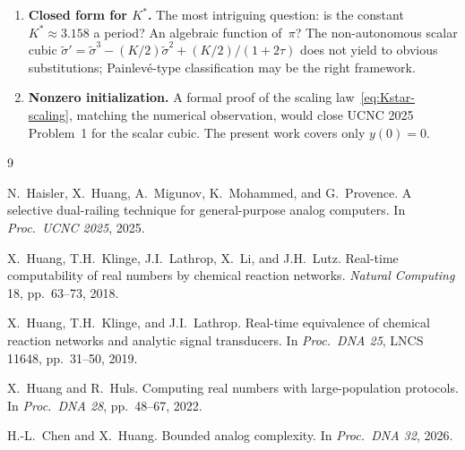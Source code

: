 \documentclass[11pt]{article}
\begin{document}
\begin{enumerate}
\item \textbf{Closed form for $K^{*}$.}  The most intriguing question: is the
      constant $K^{*} \approx 3.158$ a period?  An algebraic function of~$\pi$?
      The non-autonomous scalar cubic
      $\tilde{\sigma}' = \tilde{\sigma}^{3} - (K/2) \tilde{\sigma}^{2}
      + (K/2)/(1 + 2\tau)$ does not yield to obvious substitutions;
      Painlev\'e-type classification may be the right framework.

\item \textbf{Nonzero initialization.}  A formal proof of the scaling
      law~\eqref{eq:Kstar-scaling}, matching the numerical observation, would
      close UCNC 2025 Problem~1 for the scalar cubic.  The present work covers
      only $y(0) = 0$.
\end{enumerate}

\begin{thebibliography}{9}

N.~Haisler, X.~Huang, A.~Migunov, K.~Mohammed, and G.~Provence.
\newblock A selective dual-railing technique for general-purpose analog
  computers.
\newblock In \emph{Proc.\ UCNC 2025}, 2025.

X.~Huang, T.H.~Klinge, J.I.~Lathrop, X.~Li, and J.H.~Lutz.
\newblock Real-time computability of real numbers by chemical reaction networks.
\newblock \emph{Natural Computing} 18, pp.~63--73, 2018.

X.~Huang, T.H.~Klinge, and J.I.~Lathrop.
\newblock Real-time equivalence of chemical reaction networks and analytic
  signal transducers.
\newblock In \emph{Proc.\ DNA 25}, LNCS 11648, pp.~31--50, 2019.

X.~Huang and R.~Huls.
\newblock Computing real numbers with large-population protocols.
\newblock In \emph{Proc.\ DNA 28}, pp.~48--67, 2022.

H.-L.~Chen and X.~Huang.
\newblock Bounded analog complexity.
\newblock In \emph{Proc.\ DNA 32}, 2026.

\end{thebibliography}
\end{document}
